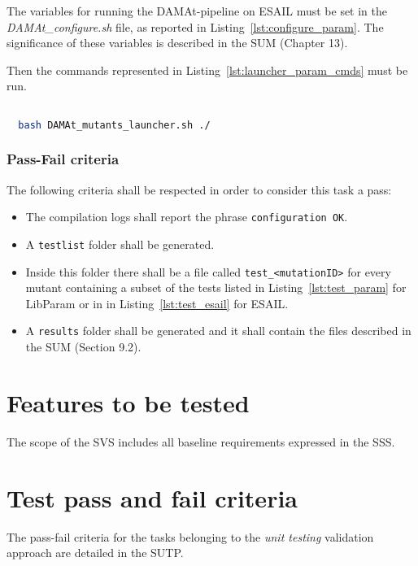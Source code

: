 The variables for running the DAMAt-pipeline on ESAIL must be set in the \emph{DAMAt\_configure.sh} file, as reported in Listing~\ref{lst:configure_param}. The significance of these variables is described in the SUM (Chapter 13).

Then the commands represented in Listing~\ref{lst:launcher_param_cmds} must be run.

  \begin{lstlisting}[language=bash, label={lst:launcher_param_cmds}]

  bash DAMAt_mutants_launcher.sh ./

  \end{lstlisting}

\subsubsection{Pass-Fail criteria}

The following criteria shall be respected in order to consider this task a pass:

\begin{itemize}
  \item The compilation logs shall report the phrase \texttt{configuration OK}.
  \item A \texttt{testlist} folder shall be generated.
  \item Inside this folder there shall be a file called \texttt{test\_<mutationID>} for every mutant containing a subset of the tests listed in Listing~\ref{lst:test_param} for LibParam or in in Listing~\ref{lst:test_esail} for ESAIL.
  \item A \texttt{results} folder shall be generated and it shall contain the files described in the SUM (Section 9.2).
\end{itemize}

\section{Features to be tested}
The scope of the SVS includes all baseline requirements expressed in the SSS.


\section{Test pass and fail criteria}
The pass-fail criteria for the tasks belonging to the \emph{unit testing} validation approach are detailed in the SUTP.

